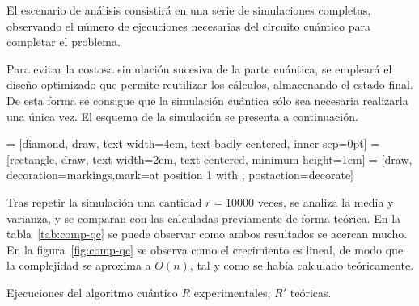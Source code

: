 El escenario de análisis consistirá en una serie de simulaciones completas, 
observando el número de ejecuciones necesarias del circuito cuántico para 
completar el problema.

Para evitar la costosa simulación sucesiva de la parte cuántica, se empleará el 
diseño optimizado que permite reutilizar los cálculos, almacenando el estado 
final. De esta forma se consigue que la simulación cuántica sólo sea necesaria 
realizarla una única vez. El esquema de la simulación se presenta a 
continuación.

\begin{center}
 = [diamond, draw, text width=4em, text badly centered, 
inner sep=0pt]
 = [rectangle, draw, text width=2em, text centered, minimum 
height=1cm]
 = [draw, decoration={markings,mark=at position 
1 with {}}, postaction={decorate}]
%
\end{center}

Tras repetir la simulación una cantidad $r = 10000$ veces, se analiza la media y 
varianza, y se comparan con las calculadas previamente de forma teórica. En la 
tabla~\ref{tab:comp-qc} se puede observar como ambos resultados se acercan 
mucho. En la figura~\ref{fig:comp-qc} se observa como el crecimiento es lineal, 
de modo que la complejidad se aproxima a $O(n)$, tal y como se había calculado 
teóricamente.


\begin{table}[!htb]
\centering
{}
\caption{Ejecuciones del algoritmo cuántico $R$ experimentales, $R'$ teóricas.}
\label{tab:comp-qc}
\end{table}

